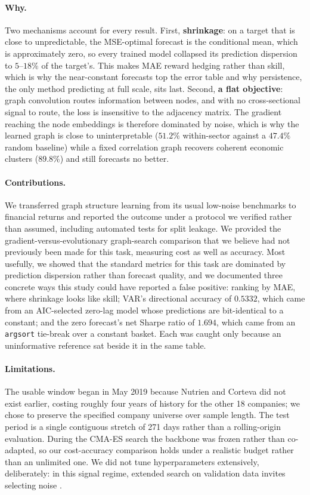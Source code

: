 \paragraph{Why.} Two mechanisms account for every result. First, \textbf{shrinkage}: on a target that is close to unpredictable, the MSE-optimal forecast is the conditional mean, which is approximately zero, so every trained model collapsed its prediction dispersion to $5$--$18\%$ of the target's. This makes MAE reward hedging rather than skill, which is why the near-constant forecasts top the error table and why persistence, the only method predicting at full scale, sits last. Second, \textbf{a flat objective}: graph convolution routes information between nodes, and with no cross-sectional signal to route, the loss is insensitive to the adjacency matrix. The gradient reaching the node embeddings is therefore dominated by noise, which is why the learned graph is close to uninterpretable ($51.2\%$ within-sector against a $47.4\%$ random baseline) while a fixed correlation graph recovers coherent economic clusters ($89.8\%$) and still forecasts no better.

\paragraph{Contributions.} We transferred graph structure learning from its usual low-noise benchmarks to financial returns and reported the outcome under a protocol we verified rather than assumed, including automated tests for split leakage. We provided the gradient-versus-evolutionary graph-search comparison that we believe had not previously been made for this task, measuring cost as well as accuracy. Most usefully, we showed that the standard metrics for this task are dominated by prediction dispersion rather than forecast quality, and we documented three concrete ways this study could have reported a false positive: ranking by MAE, where shrinkage looks like skill; VAR's directional accuracy of $0.5332$, which came from an AIC-selected zero-lag model whose predictions are bit-identical to a constant; and the zero forecast's net Sharpe ratio of $1.694$, which came from an \texttt{argsort} tie-break over a constant basket. Each was caught only because an uninformative reference sat beside it in the same table.

\paragraph{Limitations.} The usable window began in May 2019 because Nutrien and Corteva did not exist earlier, costing roughly four years of history for the other 18 companies; we chose to preserve the specified company universe over sample length. The test period is a single contiguous stretch of 271 days rather than a rolling-origin evaluation. During the CMA-ES search the backbone was frozen rather than co-adapted, so our cost-accuracy comparison holds under a realistic budget rather than an unlimited one. We did not tune hyperparameters extensively, deliberately: in this signal regime, extended search on validation data invites selecting noise \parencite{harvey2016cross}.

